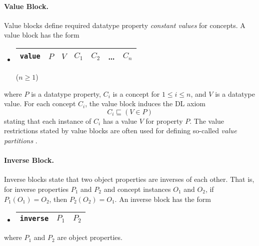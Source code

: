 \documentclass[preprint,number]{elsarticle}
\begin{document}
\paragraph{Value Block.} Value blocks define required datatype
property \emph{constant values} for concepts. A value block has the
form
\begin{itemize}
\item[]
  \begin{tabular}{|l|l|l|l|l|l|l|}\hline \texttt{value} & $P$ & $V$ & $C_1$
    & $C_2$ & \dots & $C_n$ \\ \hline
  \end{tabular} \hfill ($n \ge 1$)
\end{itemize}
where $P$ is a datatype property, $C_i$ is a concept for $1 \le i \le
n$, and $V$ is a datatype value. For each concept $C_i$, the value
block induces the DL axiom \[C_i \sqsubseteq (V \in P)\] stating that
each instance of $C_i$ has a value $V$ for property $P$.  The value
restrictions stated by value blocks are often used for defining
so-called \emph{value partitions} \cite{co-ode}.

\paragraph{Inverse Block.} Inverse blocks state that two object
properties are inverses of each other. That is, for inverse properties
$P_1$ and $P_2$ and concept instances $O_1$ and $O_2$, if $P_1(O_1) =
O_2$, then $P_2(O_2) = O_1$.  An inverse block has the form
\begin{itemize}
\item[]
  \begin{tabular}{|l|l|l|}\hline \texttt{inverse} & $P_1$ & $P_2$
\\ \hline
  \end{tabular}
\end{itemize}
where $P_1$ and $P_2$ are object properties. 
\end{document}
